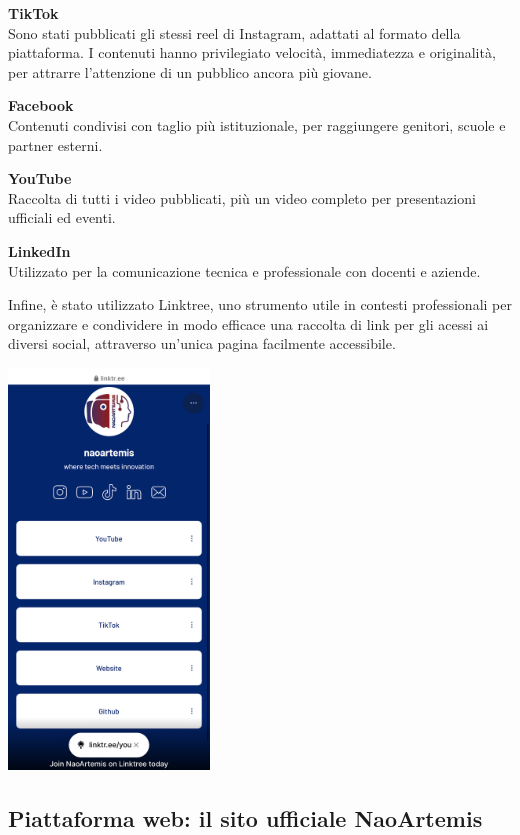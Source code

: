 \documentclass{optica-article}
\begin{document}
\textbf{TikTok}\\
Sono stati pubblicati gli stessi reel di Instagram, adattati al formato della piattaforma. I contenuti hanno privilegiato velocit\`a, immediatezza e originalit\`a, per attrarre l’attenzione di un pubblico ancora pi\`u giovane.

\textbf{Facebook}\\
Contenuti condivisi con taglio pi\`u istituzionale, per raggiungere genitori, scuole e partner esterni.

\textbf{YouTube}\\
Raccolta di tutti i video pubblicati, pi\`u un video  completo per presentazioni ufficiali ed eventi.

\textbf{LinkedIn}\\
Utilizzato per la comunicazione tecnica e professionale con docenti e aziende.

Infine, è stato utilizzato Linktree, uno strumento utile in contesti professionali per organizzare e condividere in modo efficace una raccolta di link per gli acessi ai diversi social, attraverso un'unica pagina facilmente accessibile.

\begin{center}
    \includegraphics[width=0.4\textwidth]{figures/linktree.jpg}
\end{center}

\subsection{Piattaforma web: il sito ufficiale NaoArtemis}
\end{document}
